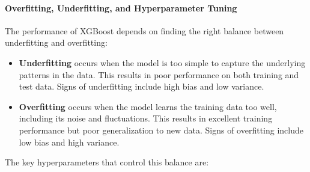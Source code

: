\paragraph{Overfitting, Underfitting, and Hyperparameter Tuning}

The performance of XGBoost depends on finding the right balance between underfitting and overfitting:

\begin{itemize}
    \item \textbf{Underfitting} occurs when the model is too simple to capture the underlying patterns in the data. This results in poor performance on both training and test data. Signs of underfitting include high bias and low variance.
    
    \item \textbf{Overfitting} occurs when the model learns the training data too well, including its noise and fluctuations. This results in excellent training performance but poor generalization to new data. Signs of overfitting include low bias and high variance.
\end{itemize}

The key hyperparameters that control this balance are:

